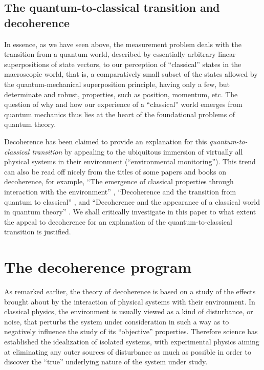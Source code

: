 \documentclass[twocolumn,rmp,aps,amsmath,amsfonts,noshowkeys,noshowpacs]{revtex4}
\begin{document}
\subsection{The quantum-to-classical transition and decoherence}

In essence, as we have seen above, the measurement problem deals with
the transition from a quantum world, described by essentially
arbitrary linear superpositions of state vectors, to our perception of
``classical'' states in the macroscopic world, that is, a
comparatively small subset of the states allowed by the quantum-mechanical
superposition principle, having only a few, but determinate and robust,
properties, such as position, momentum, etc. The question of why and
how our experience of a ``classical'' world emerges from quantum
mechanics thus lies at the heart of the foundational problems of
quantum theory.

Decoherence has been claimed to provide an explanation for this
\emph{quantum-to-classical transition} by appealing to the ubiquitous
immersion of virtually all physical systems in their environment
(``environmental monitoring'').  This trend can also be read off
nicely from the titles of some papers and books on decoherence, for
example, ``The emergence of classical properties through interaction
with the environment'' \citep{Joos:1985:iu}, ``Decoherence and the
transition from quantum to classical'' \citep{Zurek:1991:vv}, and
``Decoherence and the appearance of a classical world in quantum
theory'' \citep{Joos:2003:jh}. We shall critically investigate in this
paper to what extent the appeal to decoherence for an explanation of
the quantum-to-classical transition is justified.


\section{\label{sec:decoherence}The decoherence program}

As remarked earlier, the theory of decoherence is based on a study of
the effects brought about by the interaction of physical systems with
their environment. In classical physics, the environment is usually
viewed as a kind of disturbance, or noise, that perturbs the system
under consideration in such a way as to negatively influence the study
of its ``objective'' properties. Therefore science has established the
idealization of isolated systems, with experimental physics aiming at
eliminating any outer sources of disturbance as much as possible in
order to discover the ``true'' underlying nature of the system under
study.
\end{document}
